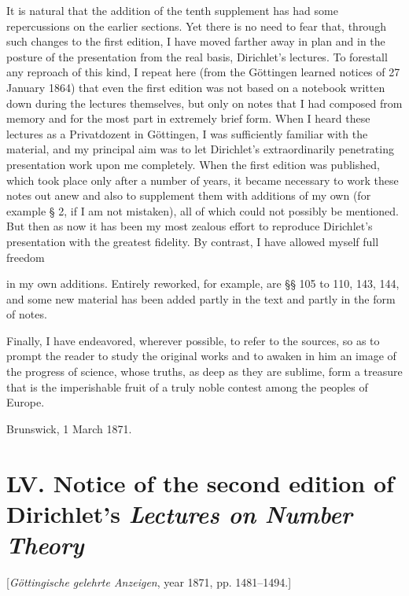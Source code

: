 \documentclass[11pt]{article}
\newcommand{\origpage}[1]{\par\vspace{0.25em}\noindent{\footnotesize\itshape [Printed page #1]}\par\vspace{0.25em}}
\begin{document}
It is natural that the addition of the tenth supplement has had some repercussions on the earlier sections. Yet there is no need to fear that, through such changes to the first edition, I have moved farther away in plan and in the posture of the presentation from the real basis, Dirichlet's lectures. To forestall any reproach of this kind, I repeat here (from the Göttingen learned notices of 27 January 1864) that even the first edition was not based on a notebook written down during the lectures themselves, but only on notes that I had composed from memory and for the most part in extremely brief form. When I heard these lectures as a Privatdozent in Göttingen, I was sufficiently familiar with the material, and my principal aim was to let Dirichlet's extraordinarily penetrating presentation work upon me completely. When the first edition was published, which took place only after a number of years, it became necessary to work these notes out anew and also to supplement them with additions of my own (for example § 2, if I am not mistaken), all of which could not possibly be mentioned. But then as now it has been my most zealous effort to reproduce Dirichlet's presentation with the greatest fidelity. By contrast, I have allowed myself full freedom

\origpage{398}
in my own additions. Entirely reworked, for example, are §§ 105 to 110, 143, 144, and some new material has been added partly in the text and partly in the form of notes.

Finally, I have endeavored, wherever possible, to refer to the sources, so as to prompt the reader to study the original works and to awaken in him an image of the progress of science, whose truths, as deep as they are sublime, form a treasure that is the imperishable fruit of a truly noble contest among the peoples of Europe.

\begin{flushright}Brunswick, 1 March 1871.\end{flushright}

\origpage{399}
\section*{LV. Notice of the second edition of Dirichlet's \textit{Lectures on Number Theory}}
\begin{center}\small [\textit{Göttingische gelehrte Anzeigen}, year 1871, pp. 1481--1494.]\end{center}
\end{document}

